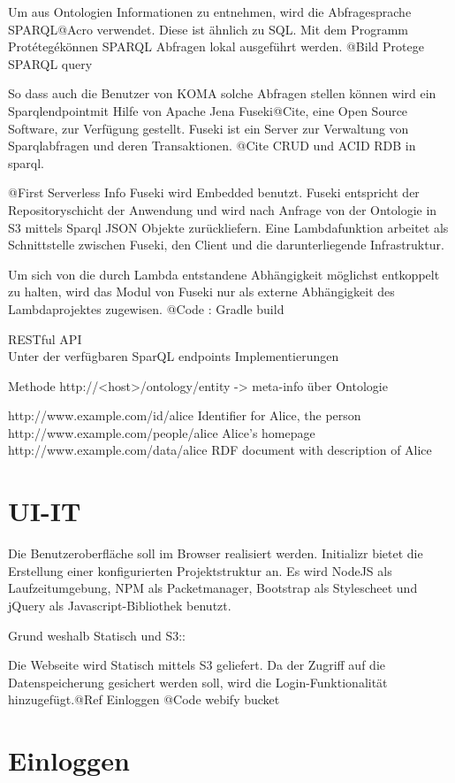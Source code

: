 \documentclass[
12pt,
english,
ngerman,
headsepline,
twoside,
openright,
numbers=noenddot,version=first
]{scrreprt}
\begin{document}
Um aus Ontologien Informationen zu entnehmen, wird die Abfragesprache \glqq SPARQL\grqq @Acro verwendet. Diese ist ähnlich zu SQL. Mit dem Programm \glqq Protétegé\grqq können SPARQL Abfragen lokal ausgeführt werden. 
@Bild Protege SPARQL query

So dass auch die Benutzer von KOMA solche Abfragen stellen können wird ein \glqq Sparqlendpoint\grqq mit Hilfe von Apache Jena Fuseki@Cite, eine Open Source Software, zur Verfügung gestellt. Fuseki ist ein Server zur Verwaltung von Sparqlabfragen und deren Transaktionen. @Cite CRUD und ACID RDB in sparql. 

@First Serverless Info
Fuseki wird Embedded benutzt.
Fuseki entspricht der Repositoryschicht der Anwendung und wird nach Anfrage von der Ontologie in S3 mittels Sparql JSON Objekte zurückliefern. 
Eine Lambdafunktion arbeitet als Schnittstelle zwischen Fuseki, den Client und die darunterliegende Infrastruktur. 

Um sich von die durch Lambda entstandene Abhängigkeit möglichst entkoppelt zu halten, wird das Modul von Fuseki nur als externe Abhängigkeit des Lambdaprojektes zugewisen. 
@Code : Gradle build

RESTful API \\
Unter der verfügbaren SparQL endpoints Implementierungen

Methode http://<host>/ontology/entity -> meta-info über Ontologie

http://www.example.com/id/alice
Identifier for Alice, the person
http://www.example.com/people/alice
Alice's homepage
http://www.example.com/data/alice
RDF document with description of Alice

\section{UI-IT}

Die Benutzeroberfläche soll im Browser realisiert werden. Initializr bietet die Erstellung einer konfigurierten Projektstruktur an. Es wird NodeJS als Laufzeitumgebung, NPM als Packetmanager, Bootstrap als Stylescheet und jQuery als Javascript-Bibliothek benutzt. 

Grund weshalb Statisch und S3:: 

Die Webseite wird Statisch mittels S3 geliefert. Da der Zugriff auf die Datenspeicherung gesichert werden soll, wird die  Login-Funktionalität hinzugefügt.@Ref Einloggen
@Code webify bucket



\section{Einloggen}
\end{document}
